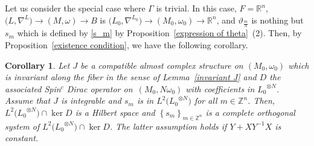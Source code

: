 \documentclass[pdftex]{sigma}
\numberwithin{equation}{section}
\newtheorem{Corollary}[Theorem]{Corollary}
\newcommand{\R}{\mathbb{R}}
\newcommand{\Z}{\mathbb{Z}}
\begin{document}
Let us consider the special case where $\Gamma$ is trivial. In this case, $F=\R^n$, ${\bigl(L,\nabla^L\bigr)\!\to\! (M,\omega)\!\to\! B}$ is $\bigl({L_0},\nabla^{L_0}\bigr)\to (M_0,\omega_0)\to \R^n$, and $\vartheta_{\frac{m}{N}}$ is nothing but $s_m$ which is defined by \eqref{s_m} by Proposition~\ref{expression of theta}~(2).
Then, by Proposition~\ref{existence condition}, we have the following corollary.
\begin{Corollary}\label{main0}
Let $J$ be a compatible almost complex structure on $(M_0,\omega_0)$ which is invariant along the fiber in the sense of Lemma~{\rm\ref{invariant J}} and $D$ the associated Spin${}^c$ Dirac operator on~$(M_0,N\omega_0)$ with coefficients in ${L_0}^{\otimes N}$. Assume that $J$ is integrable and $s_m$ is in $L^2\bigl({L_0}^{\otimes N}\bigr)$ for all $m\in \Z^n$.
Then, $L^2\bigl({L_0}^{\otimes N}\bigr)\cap \ker D$ is a Hilbert space and $\left\{s_m\right\}_{m\in \Z^n}$ is a complete orthogonal system of $L^2\bigl({L_0}^{\otimes N}\bigr)\cap \ker D$. The latter assumption holds if $Y+XY^{-1}X$ is constant.
\end{Corollary}
\end{document}
